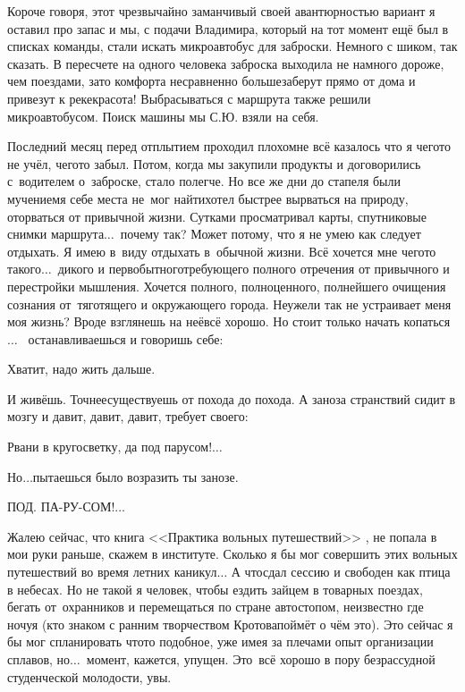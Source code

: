 Короче говоря, этот чрезвычайно заманчивый своей авантюрностью вариант я оставил про запас и мы, с подачи Владимира, который на тот момент ещё был в списках команды, стали искать микроавтобус для заброски. Немного с шиком, так сказать. В пересчете на одного человека заброска выходила не намного дороже, чем поездами, зато комфорта несравненно больше\mdash заберут прямо от дома и привезут к реке\mdash  красота! Выбрасываться с маршрута также решили микроавтобусом. Поиск машины мы С.Ю. взяли на себя.

Последний месяц перед отплытием проходил плохо\mdash мне всё казалось что я чего\sdash то не учёл, чего\sdash то забыл. Потом, когда мы закупили продукты и договорились с~водителем о~заброске, стало полегче. Но все же дни до стапеля были мучением\mdash я себе места не~мог найти\mdash хотел быстрее вырваться на природу, оторваться от привычной жизни. Сутками просматривал карты, спутниковые снимки маршрута$\ldots$~почему так? Может потому, что я не умею как следует отдыхать. Я имею в~виду отдыхать в~обычной жизни. Всё хочется мне чего\sdash то такого$\ldots$~дикого и первобытного\mdash  требующего полного отречения от привычного и перестройки мышления. Хочется полного, полноценного, полнейшего очищения сознания от~тяготящего и окружающего города. Неужели так не устраивает меня моя жизнь? Вроде взглянешь на неё\mdash всё хорошо. Но стоит только начать копаться$\ldots$~ останавливаешься и говоришь себе: 

\diagdash Хватит, надо жить дальше. 

И живёшь. Точнее\mdash существуешь от похода до похода. А заноза странствий сидит в мозгу и давит, давит, давит, требует своего:

\diagdash Рвани в кругосветку, да под парусом!$\ldots$

\diagdash Но$\ldots$\mdash пытаешься было возразить ты занозе.

\diagdash ПОД. ПА-РУ-СОМ!$\ldots$

Жалею сейчас, что книга <<Практика вольных путешествий>> \cite{Кротов}, не попала в мои руки раньше, скажем в институте. Сколько я бы мог совершить этих вольных путешествий во время летних каникул$\ldots$ А что\mdash сдал сессию и свободен как птица в небесах. Но не такой я человек, чтобы ездить зайцем в товарных поездах, бегать от~охранников и перемещаться по стране автостопом, неизвестно где ночуя (кто знаком с ранним творчеством Кротова\mdash поймёт о чём это). Это сейчас я бы мог спланировать что\sdash то подобное, уже имея за плечами опыт организации сплавов, но$\ldots$~момент, кажется, упущен. Это~всё хорошо в пору безрассудной студенческой молодости, увы.

